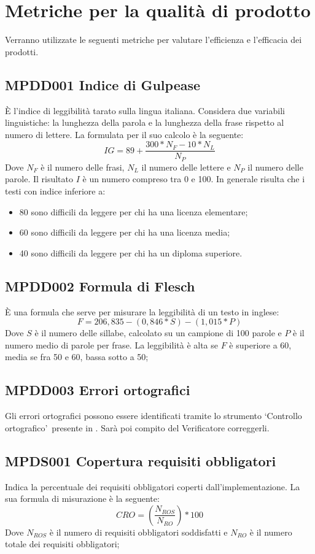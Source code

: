 \documentclass[NormeDiProgetto.tex]{subfiles}
\begin{document}
\section{Metriche per la qualità di prodotto}
	Verranno utilizzate le seguenti metriche per valutare l'efficienza e l'efficacia dei prodotti.
		\subsection{MPDD001 Indice di Gulpease} \`{E} l'indice di leggibilità tarato sulla lingua italiana. Considera due variabili linguistiche: la lunghezza della parola e la lunghezza della frase rispetto al numero di lettere. La formulata per il suo calcolo è la seguente:
		\[IG=89+\dfrac{300*N_F-10*N_L}{N_P}\] Dove $ N_F $ è il numero delle frasi, $ N_L $ il numero delle lettere e $ N_P $ il numero delle parole. Il risultato $I$ è un numero compreso tra 0 e 100. In generale risulta che i testi con indice inferiore a:
		\begin{itemize}
			\item 80 sono difficili da leggere per chi ha una licenza elementare;
			\item 60 sono difficili da leggere per chi ha una licenza media;
			\item 40 sono difficili da leggere per chi ha un diploma superiore.
		\end{itemize}	
		\subsection {MPDD002 Formula di Flesch} \`{E} una formula che serve per misurare la leggibilità di un testo in inglese:
		\[F=206,835-(0,846*S)-(1,015*P)\] Dove $ S $ è il numero delle sillabe, calcolato su un campione di 100 parole e $ P $ è il numero medio di parole per frase.
		La leggibilità è alta se $F$ è superiore a 60, media se fra 50 e 60, bassa sotto a 50;
		\subsection{MPDD003 Errori ortografici} Gli errori ortografici possono essere identificati tramite lo strumento \textquoteleft Controllo ortografico\textquoteright\ presente in . Sarà poi compito del Verificatore correggerli.  	
	

		\subsection{MPDS001 Copertura requisiti obbligatori} Indica la percentuale dei requisiti obbligatori coperti dall'implementazione. La sua formula di misurazione è la seguente: \[CRO=(\frac{N_{ROS}}{N_{RO}})*100\] Dove $ N_{ROS} $ è il numero di requisiti obbligatori soddisfatti e $ N_{RO} $ è il numero totale dei requisiti obbligatori;
\end{document}
